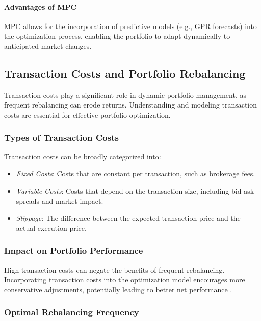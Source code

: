 \paragraph{Advantages of MPC}

MPC allows for the incorporation of predictive models (e.g., GPR forecasts) into the optimization process, enabling the portfolio to adapt dynamically to anticipated market changes.

\subsection{Transaction Costs and Portfolio Rebalancing}

Transaction costs play a significant role in dynamic portfolio management, as frequent rebalancing can erode returns. Understanding and modeling transaction costs are essential for effective portfolio optimization.

\subsubsection{Types of Transaction Costs}

Transaction costs can be broadly categorized into:

\begin{itemize}
    \item \textit{Fixed Costs}: Costs that are constant per transaction, such as brokerage fees.
    \item \textit{Variable Costs}: Costs that depend on the transaction size, including bid-ask spreads and market impact.
    \item \textit{Slippage}: The difference between the expected transaction price and the actual execution price.
\end{itemize}

\subsubsection{Impact on Portfolio Performance}

High transaction costs can negate the benefits of frequent rebalancing. Incorporating transaction costs into the optimization model encourages more conservative adjustments, potentially leading to better net performance \cite{garleanu2009dynamic}.

\subsubsection{Optimal Rebalancing Frequency}


